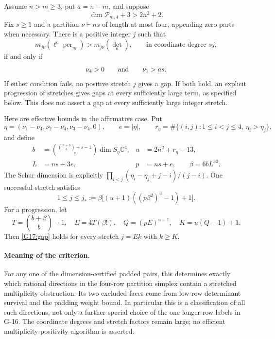 \begin{theorem}\label{G-17}
Assume $n>m\geq3$, put $a=n-m$, and suppose
\[
 \dim\mathcal P_{m,4}+3>2n^2+2.
\]
Fix $s\geq1$ and a partition $\nu\vdash ns$ of length at most four,
appending zero parts when necessary. There is a positive integer $j$
such that
\begin{equation}\label{G17:gap}
 m_{j\nu}(\ell^a\operatorname{per}_m)>m_{j\nu}(\det_n),
 \qquad\text{in coordinate degree }sj,
\end{equation}
if and only if
\begin{equation}\label{G17:criterion}
 \nu_4>0\qquad\hbox{and}\qquad\nu_1>as.
\end{equation}
If either condition fails, no positive stretch $j$ gives a gap.
If both hold, an explicit progression of stretches gives gaps at
every sufficiently large term, as specified below. This does not
assert a gap at every sufficiently large integer stretch.

Here are effective bounds in the affirmative case. Put
\[
 \eta=(\nu_1-\nu_4,\nu_2-\nu_4,\nu_3-\nu_4,0),\qquad e=|\eta|,
 \qquad r_\eta=\#\{(i,j):1\leq i<j\leq4,\ \eta_i>\eta_j\},
\]
and define
\[
 \begin{aligned}
 b&=\binom{\binom{n+3}{3}+s-1}{s}\dim S_\eta\mathbb C^4,
 &u&=2n^2+r_\eta-13,\\
 L&=ns+3e,&p&=ns+e,\qquad \beta=6bL^{30}.
 \end{aligned}
\]
The Schur dimension is explicitly
$\prod_{i<j}(\eta_i-\eta_j+j-i)/(j-i)$.
One successful stretch satisfies
\begin{equation}\label{G17:firststretch}
 1\leq j\leq
 j_*:=\beta\bigl[(u+1)((p\beta^2)^u-1)+1\bigr].
\end{equation}
For a progression, let
\[
 T=\binom{b+\beta}{b}-1,\quad E=4T(\beta!),\quad
 Q=(pE)^{u-1},\quad K=u(Q-1)+1.
\]
Then \eqref{G17:gap} holds for every stretch $j=Ek$ with $k\geq K$.
\end{theorem}

\paragraph{Meaning of the criterion.}
For any one of the dimension-certified padded pairs, this determines
exactly which rational directions in the four-row partition simplex
contain a stretched multiplicity obstruction. Its two excluded faces
come from low-row determinant survival and the padding weight bound.
In particular this is a classification of all such directions,
not only a further special choice of the one-longer-row labels in G-16.
The coordinate degrees and stretch factors remain large; no efficient
multiplicity-positivity algorithm is asserted.

